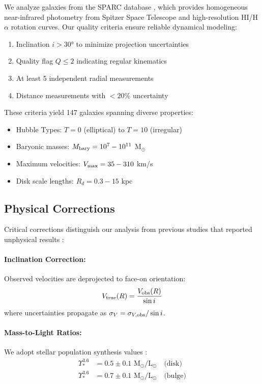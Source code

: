 \documentclass[aps,prd,twocolumn,superscriptaddress,nofootinbib,longbibliography]{revtex4-2}
\begin{document}
We analyze galaxies from the SPARC database \cite{Lelli2016SPARC}, which provides homogeneous near-infrared photometry from Spitzer Space Telescope and high-resolution HI/H$\alpha$ rotation curves. Our quality criteria ensure reliable dynamical modeling:

\begin{enumerate}
\item Inclination $i > 30°$ to minimize projection uncertainties
\item Quality flag $Q \leq 2$ indicating regular kinematics
\item At least 5 independent radial measurements
\item Distance measurements with $<20\%$ uncertainty
\end{enumerate}

These criteria yield 147 galaxies spanning diverse properties:
\begin{itemize}
\item Hubble Types: $T = 0$ (elliptical) to $T = 10$ (irregular)
\item Baryonic masses: $M_{\rm bary} = 10^7 - 10^{11}$ M$_\odot$
\item Maximum velocities: $V_{\rm max} = 35 - 310$ km/s
\item Disk scale lengths: $R_d = 0.3 - 15$ kpc
\end{itemize}

\subsection{Physical Corrections}

Critical corrections distinguish our analysis from previous studies that reported unphysical results \cite{Desmond2023}:

\paragraph{Inclination Correction:}
Observed velocities are deprojected to face-on orientation:
\begin{equation}
V_{\rm true}(R) = \frac{V_{\rm obs}(R)}{\sin i}
\end{equation}
where uncertainties propagate as $\sigma_V = \sigma_{V,{\rm obs}}/\sin i$.

\paragraph{Mass-to-Light Ratios:}
We adopt stellar population synthesis values \cite{Bell2003,McGaugh2014,Schombert2019}:
\begin{align}
\Upsilon_{*}^{3.6} &= 0.5 \pm 0.1 \text{ M}_\odot/\text{L}_\odot \quad \text{(disk)} \\
\Upsilon_{*}^{3.6} &= 0.7 \pm 0.1 \text{ M}_\odot/\text{L}_\odot \quad \text{(bulge)}
\end{align}
\end{document}
